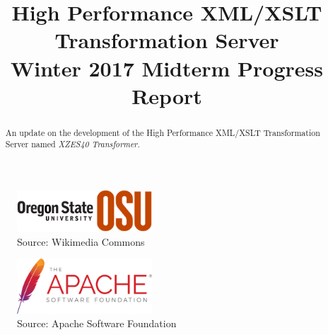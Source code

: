

\title{
	High Performance XML/XSLT Transformation Server \\
    {
    	\LARGE Winter 2017 Midterm Progress Report 
    }
}
\author{
}



\maketitle
\begin{abstract}
  An update on the development of the High Performance XML/XSLT Transformation Server named \textit{XZES40 Transformer}.
\end{abstract}

\begin{figure}[h]
  \begin{centering}
    \includegraphics[width=0.45\textwidth]{figures/osu-logo}
    \caption{Source: Wikimedia Commons \cite{osu-logo}}
  \end{centering}
\end{figure}

\begin{figure}[h]
  \begin{centering}
    \includegraphics[width=0.45\textwidth]{figures/asf-logo}
    \caption{Source: Apache Software Foundation \cite{asf-logo}}
  \end{centering}
\end{figure}

\clearpage

